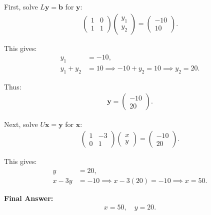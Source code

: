 \documentclass[journal,12pt,onecolumn]{IEEEtran}
\theoremstyle{remark}
\begin{document}
First, solve $L \mathbf{y} = \mathbf{b}$ for $\mathbf{y}$:
\begin{align}
    \begin{pmatrix}
        1 & 0 \\
        1 & 1
    \end{pmatrix}
    \begin{pmatrix}
        y_1 \\ y_2
    \end{pmatrix}
    =
    \begin{pmatrix}
        -10 \\ 10
    \end{pmatrix}.
\end{align}

This gives:
\begin{align}
    y_1 &= -10, \\
    y_1 + y_2 &= 10 \implies -10 + y_2 = 10 \implies y_2 = 20.
\end{align}

Thus:
\begin{align}
    \mathbf{y} =
    \begin{pmatrix}
        -10 \\ 20
    \end{pmatrix}.
\end{align}

Next, solve $U \mathbf{x} = \mathbf{y}$ for $\mathbf{x}$:
\begin{align}
    \begin{pmatrix}
        1 & -3 \\
        0 & 1
    \end{pmatrix}
    \begin{pmatrix}
        x \\ y
    \end{pmatrix}
    =
    \begin{pmatrix}
        -10 \\ 20
    \end{pmatrix}.
\end{align}

This gives:
\begin{align}
    y &= 20, \\
    x - 3y &= -10 \implies x - 3(20) = -10 \implies x = 50.
\end{align}

\textbf{Final Answer:}
\begin{align}
    x = 50, \quad y = 20.
\end{align}
\end{document}
